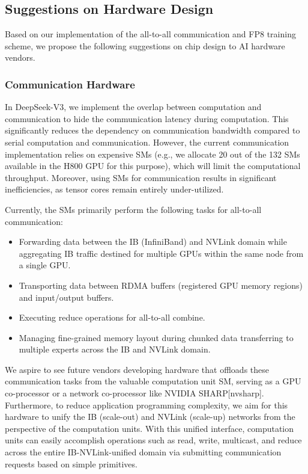 \documentclass[11pt,a4paper]{article}
\begin{document}
\subsection{Suggestions on Hardware Design}

Based on our implementation of the all-to-all communication and FP8 training scheme, we propose the following suggestions on chip design to AI hardware vendors.

\subsubsection{Communication Hardware}

In DeepSeek-V3, we implement the overlap between computation and communication to hide the communication latency during computation. 
This significantly reduces the dependency on communication bandwidth compared to serial computation and communication. 
However, the current communication implementation relies on expensive SMs (e.g., we allocate 20 out of the 132 SMs available in the H800 GPU for this purpose), which will limit the computational throughput.
Moreover, using SMs for communication results in significant inefficiencies, as tensor cores remain entirely under-utilized.

Currently, the SMs primarily perform the following tasks for all-to-all communication:

\begin{itemize}
\item Forwarding data between the IB (InfiniBand) and NVLink domain while aggregating IB traffic destined for multiple GPUs within the same node from a single GPU.
\item Transporting data between RDMA buffers (registered GPU memory regions) and input/output buffers.
\item Executing reduce operations for all-to-all combine.
\item Managing fine-grained memory layout during chunked data transferring to multiple experts across the IB and NVLink domain.
\end{itemize}

We aspire to see future vendors developing hardware that offloads these communication tasks from the valuable computation unit SM, serving as a GPU co-processor or a network co-processor like NVIDIA SHARP[nvsharp]. 
Furthermore, to reduce application programming complexity, we aim for this hardware to unify the IB (scale-out) and NVLink (scale-up) networks from the perspective of the computation units. 
With this unified interface, computation units can easily accomplish operations such as read, write, multicast, and reduce across the entire IB-NVLink-unified domain via submitting communication requests based on simple primitives.
\end{document}

